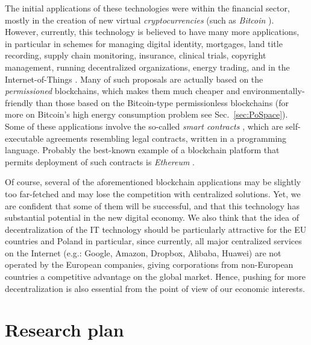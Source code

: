 \documentclass{article}
\begin{document}
The initial applications of these technologies were within the financial sector, mostly in the creation of new virtual \emph{cryptocurrencies} (such as \emph{Bitcoin} \cite{nakamoto2008bitcoin}). However, currently, this technology is believed to have many more applications, in particular in schemes for managing digital identity, mortgages, land title recording, supply chain monitoring, insurance, 
clinical trials, copyright management, running decentralized organizations, energy trading, and in the Internet-of-Things \cite{econ3,forbes,econ2,Underwood:2016:BBB:3013530.2994581,EY,ibm,Microsoft5,DHL,chamber,capgemini,pwc,EY,DHL,iot,economist-dao,pwc2}. Many of such proposals are actually based on the \emph{permissioned} blockchains, which makes them much cheaper and environmentally-friendly than those based on the Bitcoin-type permissionless blockchains (for more on Bitcoin's high energy consumption problem see Sec.~\ref{sec:PoSpace}). Some of these applications involve the so-called \emph{smart contracts} \cite{Szabo}, which are self-executable agreements resembling legal contracts, written in a programming language. Probably the best-known example of a blockchain platform that permits deployment of such contracts is \emph{Ethereum} \cite{Ethereum}. 

Of course, several of the aforementioned blockchain applications may be slightly too far-fetched and may lose the competition with centralized solutions. Yet, we are confident that some of them will be successful, and that this technology has substantial potential in the new digital economy. We also think that the idea of decentralization of the IT technology should be particularly attractive for the EU countries and Poland in particular, since currently, all major centralized services on the Internet (e.g.: Google, Amazon, Dropbox, Alibaba, Huawei) are not operated by the European companies, giving corporations from non-European countries a competitive advantage on the global market. Hence, pushing for more decentralization is also essential from the point of view of our economic interests.

\section{Research plan}
\end{document}
